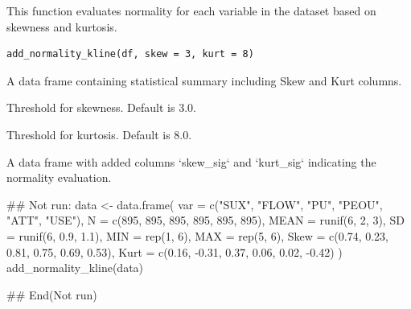 \documentclass[a4paper]{book}
\begin{document}
%
\begin{Description}
This function evaluates normality for each variable in the dataset based on skewness and kurtosis.
\end{Description}
%
\begin{Usage}
\begin{verbatim}
add_normality_kline(df, skew = 3, kurt = 8)
\end{verbatim}
\end{Usage}
%
\begin{Arguments}
\begin{ldescription}
\item[\code{df}] A data frame containing statistical summary including Skew and Kurt columns.

\item[\code{skew}] Threshold for skewness. Default is 3.0.

\item[\code{kurt}] Threshold for kurtosis. Default is 8.0.
\end{ldescription}
\end{Arguments}
%
\begin{Value}
A data frame with added columns `skew\_sig` and `kurt\_sig` indicating the normality evaluation.
\end{Value}
%
\begin{Examples}
\begin{ExampleCode}
\#\# Not run: 
data <- data.frame(
  var = c("SUX", "FLOW", "PU", "PEOU", "ATT", "USE"),
  N = c(895, 895, 895, 895, 895, 895),
  MEAN = runif(6, 2, 3),
  SD = runif(6, 0.9, 1.1),
  MIN = rep(1, 6),
  MAX = rep(5, 6),
  Skew = c(0.74, 0.23, 0.81, 0.75, 0.69, 0.53),
  Kurt = c(0.16, -0.31, 0.37, 0.06, 0.02, -0.42)
)
add_normality_kline(data)

## End(Not run)
\end{ExampleCode}
\end{Examples}
\end{document}
